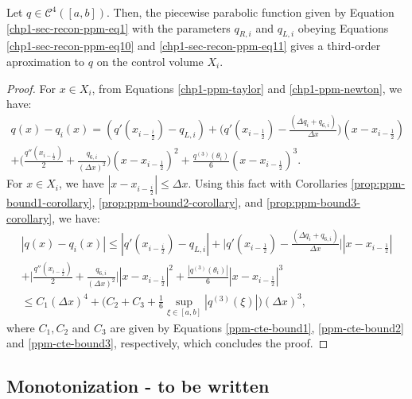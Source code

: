 \begin{prop}
	\label{prop:ppm-bound4}
	Let $q \in \mathcal{C}^{4}([a,b])$.
	Then, the piecewise parabolic function given by
	Equation \eqref{chp1-sec-recon-ppm-eq1} with 
	the parameters $q_{R,i}$ and $q_{L,i}$ obeying Equations
	\eqref{chp1-sec-recon-ppm-eq10} and \eqref{chp1-sec-recon-ppm-eq11}
	gives a third-order aproximation to $q$ on the control volume $X_i$.
\end{prop}
\begin{proof}
For $x \in X_i$, from Equations \eqref{chp1-ppm-taylor} and \eqref{chp1-ppm-newton}, we have:
\begin{equation*}
	\begin{split}
	q(x)-q_i(x) = (q'(x_{i-\frac{i}{2}})-q_{L,i})	
	+ \bigg(q'(x_{i-\frac{1}{2}})-  \frac{(\Delta q_i + q_{6, i})}{\Delta x}\bigg)(x-x_{i-\frac{1}{2}})
	\\+ \bigg(\frac{q''(x_{i-\frac{1}{2}})}{2} + \frac{q_{6, i}}{(\Delta x)^2}\bigg)(x-x_{i-\frac{1}{2}})^2
	+ \frac{q^{(3)}(\theta_i)}{6}(x-x_{i-\frac{1}{2}})^3.
	\end{split}
\end{equation*}
For $x\in X_i$, we have $|x -x_{i-\frac{i}{2}}| \leq \Delta x$. 
Using this fact with Corollaries \ref{prop:ppm-bound1-corollary}, \ref{prop:ppm-bound2-corollary},
and  \ref{prop:ppm-bound3-corollary}, we have:
\begin{equation*}
	\begin{split}
	|q(x)-q_i(x)| \leq |q'(x_{i-\frac{i}{2}})-q_{L,i}|
	+ \bigg|q'(x_{i-\frac{1}{2}})-  \frac{(\Delta q_i + q_{6, i})}{\Delta x}\bigg||x-x_{i-\frac{1}{2}}|
	\\+ \bigg|\frac{q''(x_{i-\frac{1}{2}})}{2} + \frac{q_{6, i}}{(\Delta x)^2}\bigg||x-x_{i-\frac{1}{2}}|^2
	+ \frac{|q^{(3)}(\theta_i)|}{6}|x-x_{i-\frac{1}{2}}|^3 \\
	\leq C_1(\Delta x)^4 + \bigg(C_2+C_3+\frac{1}{6}
	\sup_{\xi \in [a,b]}{|q^{(3)}(\xi)|} \bigg)(\Delta x)^3,
	\end{split}
\end{equation*}
where $C_1, C_2$ and $C_3$ are given by Equations \eqref{ppm-cte-bound1},
\eqref{ppm-cte-bound2} and \eqref{ppm-cte-bound3}, respectively, which
concludes the proof.
\renewcommand\qedsymbol{} %
\end{proof}
%

\subsection{Monotonization - to be written}
\label{chp1-sec-mono}


